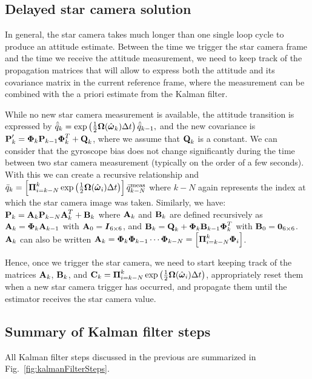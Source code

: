 \subsection{Delayed star camera solution}
\label{subsec:delayed}

In general, the star camera takes much longer than one single loop cycle to produce an attitude estimate. Between the time we trigger the star camera frame and the time we receive the attitude measurement, we need to keep track of the propagation matrices that will allow to express both the attitude and its covariance matrix in the current reference frame, where the measurement can be combined with the a priori estimate from the Kalman filter.

While no new star camera measurement is available, the attitude transition is expressed by $\hat{\bar{q}}_{k} = \exp\left(\frac{1}{2}\boldsymbol\Omega(\hat{\boldsymbol\omega}_{k})\Delta t\right)\hat{\bar{q}}_{k-1},$ and the new covariance is $\textrm{\textbf{P}}'_{k}  =  \boldsymbol{\Phi}_k \textrm{\textbf{P}}_{k-1}\boldsymbol{\Phi}^T_k + \textrm{\textbf{Q}}_k$, where we assume that $\textrm{\textbf{Q}}_k$ is a constant. We can consider that the gyroscope bias does not change significantly during the time between two star camera measurement (typically on the order of a few seconds). With this we can create a recursive relationship and $\bar{q}_{k} = \left[\boldsymbol\Pi_{i=k-N}^k\exp\left(\frac{1}{2}\boldsymbol\Omega(\hat{\boldsymbol\omega}_{i})\Delta t\right)\right]\bar{q}^{\textrm{meas}}_{k-N}$ where $k-N$ again represents the index at which the star camera image was taken. Similarly, we have: $\textrm{\textbf{P}}_{k} = \textrm{\textbf{A}}_k\textrm{\textbf{P}}_{k-N}\textrm{\textbf{A}}_k^T + \textrm{\textbf{B}}_k$ where $\textrm{\textbf{A}}_k$ and $\textrm{\textbf{B}}_k$ are defined recursively as $\textrm{\textbf{A}}_k = \boldsymbol{\Phi}_{k}\textrm{\textbf{A}}_{k-1}$ with $\textrm{\textbf{A}}_0 = \boldsymbol{I}_{6\times 6}$, and $\textrm{\textbf{B}}_k = \textrm{\textbf{Q}}_k + \boldsymbol{\Phi}_{k}\textrm{\textbf{B}}_{k-1}\boldsymbol{\Phi}_{k}^T$ with $\textrm{\textbf{B}}_0 = \boldsymbol{0}_{6\times 6}$. $\textrm{\textbf{A}}_k$ can also be written  $\textrm{\textbf{A}}_k = \boldsymbol{\Phi}_{k}\boldsymbol{\Phi}_{k-1}\cdots\boldsymbol{\Phi}_{k-N} = \left[\boldsymbol\Pi_{i=k-N}^k\boldsymbol{\Phi}_{i}\right]$.

Hence, once we trigger the star camera, we need to start keeping track of the matrices $\textrm{\textbf{A}}_k$, $\textrm{\textbf{B}}_k$, and $\textrm{\textbf{C}}_k = \boldsymbol\Pi_{i=k-N}^k\exp\left(\frac{1}{2}\boldsymbol\Omega(\hat{\boldsymbol\omega}_{i})\Delta t\right)$, appropriately reset them when a new star camera trigger has occurred, and propagate them until the estimator receives the star camera value.

\subsection{Summary of Kalman filter steps}
All Kalman filter steps discussed in the previous are summarized in Fig.~\ref{fig:kalmanFilterSteps}.

